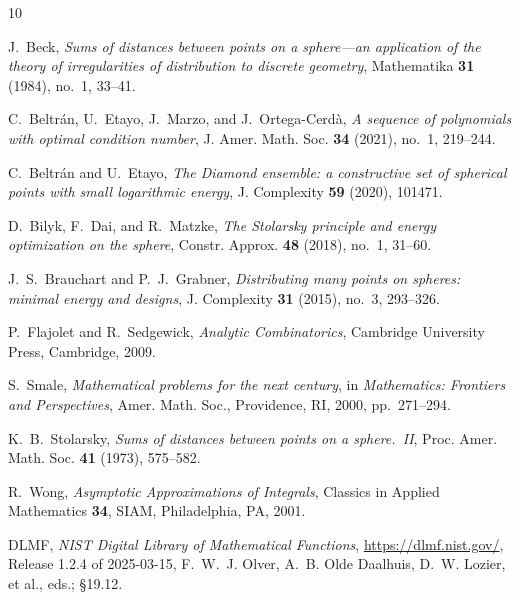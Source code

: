 \documentclass[11pt,reqno]{amsart}
\theoremstyle{definition}
\begin{document}
\begin{thebibliography}{10}

J.~Beck,
\emph{Sums of distances between points on a sphere---an application of the theory of irregularities
of distribution to discrete geometry},
Mathematika \textbf{31} (1984), no.~1, 33--41.

C.~Beltr\'an, U.~Etayo, J.~Marzo, and J.~Ortega-Cerd\`a,
\emph{A sequence of polynomials with optimal condition number},
J. Amer. Math. Soc. \textbf{34} (2021), no.~1, 219--244.

C.~Beltr\'an and U.~Etayo,
\emph{The Diamond ensemble: a constructive set of spherical points with small logarithmic energy},
J. Complexity \textbf{59} (2020), 101471.

D.~Bilyk, F.~Dai, and R.~Matzke,
\emph{The Stolarsky principle and energy optimization on the sphere},
Constr. Approx. \textbf{48} (2018), no.~1, 31--60.

J.~S.~Brauchart and P.~J.~Grabner,
\emph{Distributing many points on spheres: minimal energy and designs},
J. Complexity \textbf{31} (2015), no.~3, 293--326.

P.~Flajolet and R.~Sedgewick,
\emph{Analytic Combinatorics},
Cambridge University Press, Cambridge, 2009.

S.~Smale,
\emph{Mathematical problems for the next century},
in \emph{Mathematics: Frontiers and Perspectives}, Amer. Math. Soc., Providence, RI, 2000,
pp.~271--294.

K.~B.~Stolarsky,
\emph{Sums of distances between points on a sphere.~II},
Proc. Amer. Math. Soc. \textbf{41} (1973), 575--582.

R.~Wong,
\emph{Asymptotic Approximations of Integrals},
Classics in Applied Mathematics \textbf{34}, SIAM, Philadelphia, PA, 2001.

DLMF, \emph{NIST Digital Library of Mathematical Functions},
\url{https://dlmf.nist.gov/}, Release 1.2.4 of 2025-03-15,
F.~W.~J. Olver, A.~B. Olde Daalhuis, D.~W. Lozier, et al., eds.; \S19.12.

\end{thebibliography}
\end{document}
